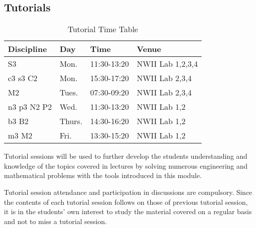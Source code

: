     \subsection{Tutorials}
        \begin{table}[!h]
            \begin{center}
             \begin{tabular}{|l|l|l|l|}
                 \hline
                 {\bf Discipline} & {\bf Day} & {\bf Time} & {\bf Venue} \\
                 \hline
                 S3          & Mon.   & 11:30-13:20 & NWII Lab 1,2,3,4 \\
                 c3 s3 C2    & Mon.   & 15:30-17:20 & NWII Lab 2,3,4 \\
                 M2          & Tues.  & 07:30-09:20 & NWII Lab 2,3,4 \\
                 n3 p3 N2 P2 & Wed.   & 11:30-13:20 & NWII Lab 1,2 \\
                 b3 B2       & Thurs. & 14:30-16:20 & NWII Lab 1,2 \\
                 m3 M2       & Fri.   & 13:30-15:20 & NWII Lab 1,2 \\
                 \hline
             \end{tabular}
             \caption{Tutorial Time Table}
            \end{center}
        \end{table}

        Tutorial sessions will be used to further develop the students
        understanding and knowledge of the topics covered in lectures by
        solving numerous engineering and mathematical problems with the
        tools introduced in this module.

        Tutorial session attendance and participation in discussions are
        compulsory. Since the contents of each tutorial session follows on
        those of previous tutorial session, it is in the students’ own
        interest to study the material covered on a regular basis and not
        to miss a tutorial session.

